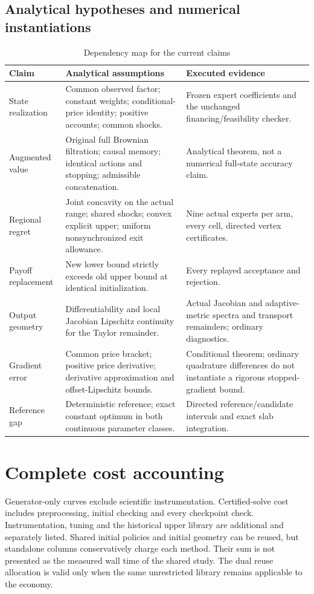 \subsection{Analytical hypotheses and numerical instantiations}
\begin{table}[htbp]\centering\small
\caption{Dependency map for the current claims}
\begin{tabularx}{\textwidth}{lXX}\toprule
Claim & Analytical assumptions & Executed evidence\\\midrule
State realization & Common observed factor; constant weights; conditional-price identity; positive accounts; common shocks. & Frozen expert coefficients and the unchanged financing/feasibility checker.\\
Augmented value & Original full Brownian filtration; causal memory; identical actions and stopping; admissible concatenation. & Analytical theorem, not a numerical full-state accuracy claim.\\
Regional regret & Joint concavity on the actual range; shared shocks; convex explicit upper; uniform nonsynchronized exit allowance. & Nine actual experts per arm, every cell, directed vertex certificates.\\
Payoff replacement & New lower bound strictly exceeds old upper bound at identical initialization. & Every replayed acceptance and rejection.\\
Output geometry & Differentiability and local Jacobian Lipschitz continuity for the Taylor remainder. & Actual Jacobian and adaptive-metric spectra and transport remainders; ordinary diagnostics.\\
Gradient error & Common price bracket; positive price derivative; derivative approximation and offset-Lipschitz bounds. & Conditional theorem; ordinary quadrature differences do not instantiate a rigorous stopped-gradient bound.\\
Reference gap & Deterministic reference; exact constant optimum in both continuous parameter classes. & Directed reference/candidate intervals and exact slab integration.\\\bottomrule
\end{tabularx}\end{table}

\section{Complete cost accounting}

Generator-only curves exclude scientific instrumentation. Certified-solve cost includes preprocessing, initial checking and every checkpoint check. Instrumentation, tuning and the historical upper library are additional and separately listed. Shared initial policies and initial geometry can be reused, but standalone columns conservatively charge each method. Their sum is not presented as the measured wall time of the shared study. The dual reuse allocation is valid only when the same unrestricted library remains applicable to the economy.

